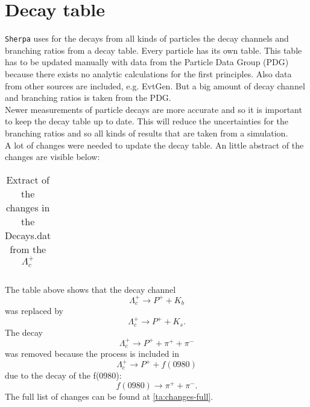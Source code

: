 \section{Decay table}
\texttt{Sherpa} uses for the decays from all kinds of particles the decay channels 
and branching ratios from a decay table. Every particle has its own table. 
This table has to be updated manually with data from the Particle Data Group (PDG) because there 
exists no analytic calculations for the first principles. Also data from other 
sources are included, e.g. EvtGen. But a big amount of decay channel and 
branching ratios is taken from the PDG{\cite{lambda-pdg}}.\\
Newer measurements of particle decays are more accurate and so it is important 
to keep the decay table up to date. This will reduce the uncertainties for the 
branching ratios and so all kinds of results that are taken from a simulation.\\
A lot of changes were needed to update the decay table. An little abstract of 
the changes are visible below:
\begin{longtable}{| c | c | c |}
  \caption{Extract of the changes in the Decays.dat from the \(\Lambda_c^+\)}\label{ta:changes-decays}\\ 
  \hline
  
\end{longtable}
The table above shows that the decay channel
\begin{equation}
  \Lambda_c^+ \rightarrow P^+ + K_b \nonumber
\end{equation}
was replaced by
\begin{equation}
  \Lambda_c^+ \rightarrow P^+ + K_s.  \nonumber
\end{equation}
The decay
\begin{equation}
  \Lambda_c^+ \rightarrow P^+ + \pi^+ + \pi^- \nonumber
\end{equation}
was removed because the process is included in
\begin{equation}
  \Lambda_c^+ \rightarrow P^+ + f(0980) \nonumber
\end{equation}
due to the decay of the f(0980):
\begin{equation}
  f(0980) \rightarrow \pi^+ + \pi^-. \nonumber
\end{equation}
The full list of changes can be found at {\ref{ta:changes-full}}.

